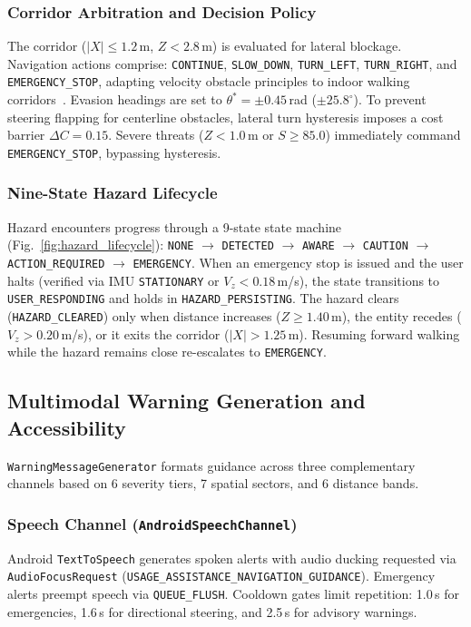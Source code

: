 \subsubsection{Corridor Arbitration and Decision Policy}
The corridor ($|X| \le 1.2$\,m, $Z < 2.8$\,m) is evaluated for lateral blockage. Navigation actions comprise: \texttt{CONTINUE}, \texttt{SLOW\_DOWN}, \texttt{TURN\_LEFT}, \texttt{TURN\_RIGHT}, and \texttt{EMERGENCY\_STOP}, adapting velocity obstacle principles to indoor walking corridors~\cite{fiorini1998motion,vandenberg2011reciprocal,helbing1995social}. Evasion headings are set to $\theta^* = \pm 0.45$\,rad ($\pm 25.8^\circ$). To prevent steering flapping for centerline obstacles, lateral turn hysteresis imposes a cost barrier $\Delta C = 0.15$. Severe threats ($Z < 1.0$\,m or $S \ge 85.0$) immediately command \texttt{EMERGENCY\_STOP}, bypassing hysteresis.

\subsubsection{Nine-State Hazard Lifecycle}
Hazard encounters progress through a 9-state state machine (Fig.~\ref{fig:hazard_lifecycle}): \texttt{NONE} $\to$ \texttt{DETECTED} $\to$ \texttt{AWARE} $\to$ \texttt{CAUTION} $\to$ \texttt{ACTION\_REQUIRED} $\to$ \texttt{EMERGENCY}. When an emergency stop is issued and the user halts (verified via IMU \texttt{STATIONARY} or $V_z < 0.18$\,m/s), the state transitions to \texttt{USER\_RESPONDING} and holds in \texttt{HAZARD\_PERSISTING}. The hazard clears (\texttt{HAZARD\_CLEARED}) only when distance increases ($Z \ge 1.40$\,m), the entity recedes ($V_z > 0.20$\,m/s), or it exits the corridor ($|X| > 1.25$\,m). Resuming forward walking while the hazard remains close re-escalates to \texttt{EMERGENCY}.

\subsection{Multimodal Warning Generation and Accessibility}
\label{sec:impl_multimodal}
\texttt{WarningMessageGenerator} formats guidance across three complementary channels based on 6 severity tiers, 7 spatial sectors, and 6 distance bands.

\subsubsection{Speech Channel (\texttt{AndroidSpeechChannel})}
Android \texttt{TextToSpeech} generates spoken alerts with audio ducking requested via \texttt{AudioFocusRequest} (\texttt{USAGE\_ASSISTANCE\_NAVIGATION\_GUIDANCE}). Emergency alerts preempt speech via \texttt{QUEUE\_FLUSH}. Cooldown gates limit repetition: 1.0\,s for emergencies, 1.6\,s for directional steering, and 2.5\,s for advisory warnings.

